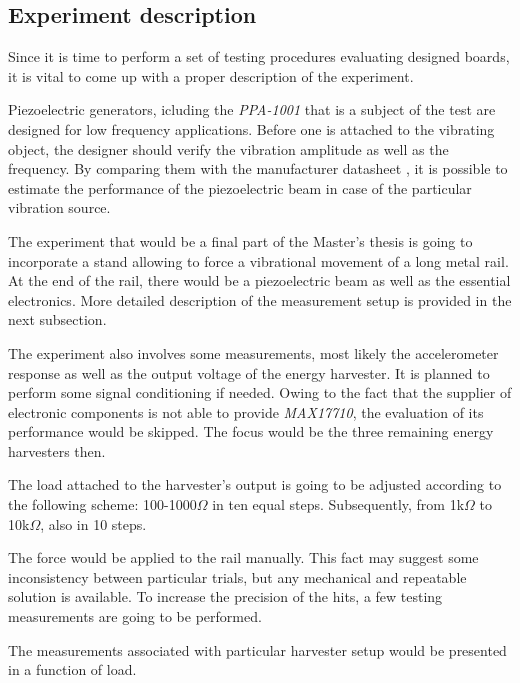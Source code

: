 \documentclass[12pt,a4paper]{article}
\begin{document}
\subsection{Experiment description}

Since it is time to perform a set of testing procedures evaluating designed boards, it is vital to come up with a proper description of the experiment.
\par
Piezoelectric generators, icluding the \textit{PPA-1001} that is a subject of the test are designed for low frequency applications. Before one is attached to the vibrating object, the designer should verify the vibration amplitude as well as the frequency. By comparing them with the manufacturer datasheet \cite{PPA}, it is possible to estimate the performance of the piezoelectric beam in case of the particular vibration source.
\par
The experiment that would be a final part of the Master's thesis is going to incorporate a stand allowing to force a vibrational movement of a long metal rail. At the end of the rail, there would be a piezoelectric beam as well as the essential electronics. More detailed description of the measurement setup is provided in the next subsection.
\par
The experiment also involves some measurements, most likely the accelerometer response as well as the output voltage of the energy harvester. It is planned to perform some signal conditioning if needed.
Owing to the fact that the supplier of electronic components is not able to provide \textit{MAX17710}, the evaluation of its performance would be skipped. The focus would be the three remaining energy harvesters then.
\par
The load attached to the harvester's output is going to be adjusted according to the following scheme: 100-1000$\Omega$ in ten equal steps. Subsequently, from 1k$\Omega$ to 10k$\Omega$, also in 10 steps.
\par
The force would be applied to the rail manually. This fact may suggest some inconsistency between particular trials, but any mechanical and repeatable solution is available. To increase the precision of the hits, a few testing measurements are going to be performed.
\par
The measurements associated with particular harvester setup would be presented in a function of load. 
\end{document}
